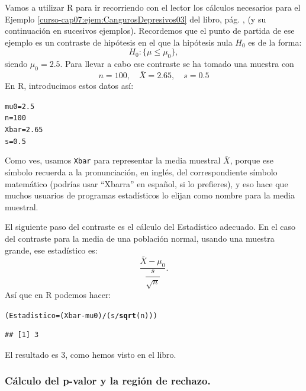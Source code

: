 \documentclass[10pt,a4paper]{article}\usepackage[]{graphicx}\usepackage[]{color}
\makeatletter
\newcommand{\hlnum}[1]{\textcolor[rgb]{0.686,0.059,0.569}{#1}}%
\newcommand{\hlopt}[1]{\textcolor[rgb]{0,0,0}{#1}}%
\newcommand{\hlstd}[1]{\textcolor[rgb]{0.345,0.345,0.345}{#1}}%
\newcommand{\hlkwb}[1]{\textcolor[rgb]{0.69,0.353,0.396}{#1}}%
\newcommand{\hlkwd}[1]{\textcolor[rgb]{0.737,0.353,0.396}{\textbf{#1}}}%
\newenvironment{kframe}{%
 \def\at@end@of@kframe{}%
 \ifinner\ifhmode%
  \def\at@end@of@kframe{\end{minipage}}%
  \begin{minipage}{\columnwidth}%
 \fi\fi%
 \def\FrameCommand##1{\hskip\@totalleftmargin \hskip-\fboxsep
 \colorbox{shadecolor}{##1}\hskip-\fboxsep
     \hskip-\linewidth \hskip-\@totalleftmargin \hskip\columnwidth}%
 \MakeFramed {\advance\hsize-\width
   \@totalleftmargin\z@ \linewidth\hsize
   \@setminipage}}%
 {\par\unskip\endMakeFramed%
 \at@end@of@kframe}
\newenvironment{knitrout}{}{} %
\newcounter {cont01}
\makeatother
\begin{document}
Vamos a utilizar R para ir recorriendo con el lector los cálculos necesarios para el Ejemplo \ref{curso-cap07:ejem:CangurosDepresivos03} del libro, pág. \pageref{curso-cap07:ejem:CangurosDepresivos03}, (y su continuación en sucesivos ejemplos). Recordemos que el punto de partida de ese ejemplo es un contraste de hipótesis en el que la hipótesis nula $H_0$ es de la forma:
\[H_0: \{\mu\leq \mu_0\},\]
siendo $\mu_0 = 2.5$. Para llevar a cabo ese contraste se ha tomado una muestra con
\[n=100, \quad \bar X=2.65, \quad s=0.5\]
En R, introducimos estos datos así:
\begin{knitrout}
\color{fgcolor}\begin{kframe}
\begin{alltt}
\hlstd{mu0} \hlkwb{=} \hlnum{2.5}
\hlstd{n} \hlkwb{=} \hlnum{100}
\hlstd{Xbar} \hlkwb{=} \hlnum{2.65}
\hlstd{s} \hlkwb{=} \hlnum{0.5}
\end{alltt}
\end{kframe}
\end{knitrout}
Como ves, usamos {\tt Xbar} para representar la media muestral $\bar X$, porque ese símbolo recuerda a la pronunciación, en inglés, del correspondiente símbolo matemático (podrías usar ``Xbarra'' en español, si lo prefieres), y eso hace que muchos usuarios de programas estadísticos lo elijan como nombre para la media muestral.

El siguiente paso del contraste es el cálculo del Estadístico adecuado. En el caso del contraste para la media de una población normal, usando una muestra grande, ese estadístico es:
\[\dfrac{\bar X - \mu_0}{\dfrac{s}{\sqrt{n}}}.\]
Así que en R podemos hacer:
\begin{knitrout}
\color{fgcolor}\begin{kframe}
\begin{alltt}
\hlstd{(Estadistico} \hlkwb{=} \hlstd{(Xbar} \hlopt{-} \hlstd{mu0)} \hlopt{/} \hlstd{(s} \hlopt{/} \hlkwd{sqrt}\hlstd{(n)))}
\end{alltt}
\begin{verbatim}
## [1] 3
\end{verbatim}
\end{kframe}
\end{knitrout}
El resultado es $3$, como hemos visto en el libro.

\subsubsection*{Cálculo del p-valor y la región de rechazo.}
\label{tut07:subsubsec:CalculoPValorEjemploCanguros}
\end{document}
